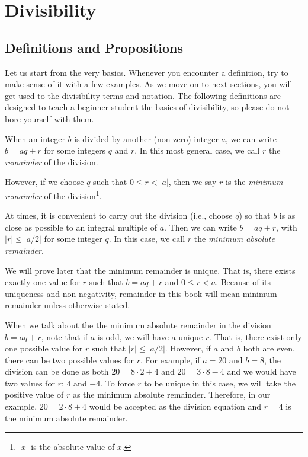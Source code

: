 \chapter{Divisibility}\label{ch:divisibility}

\section{Definitions and Propositions}
Let us start from the very basics. Whenever you encounter a definition, try to make sense of it with a few examples. As we move on to next sections, you will get used to the divisibility terms and notation. The following definitions are designed to teach a beginner student the basics of divisibility, so please do not bore yourself with them.
\begin{definition}\label{def:remainder}
	When an integer $b$ is divided by another (non-zero) integer $a$, we can write $b=aq+r$ for some integers $q$ and $r$. In this most general case, we call $r$ the \textit{remainder} of the division.

	However, if we choose $q$ such that $0\leq r< |a|$, then we say $r$ is the \textit{minimum remainder} of the division\footnote{$|x|$ is the absolute value of $x$.}.

	At times, it is convenient to carry out the division (i.e., choose $q$) so that $b$ is as close as possible to an integral multiple of $a$. Then we can write $b = aq + r$, with $|r| \leq |a/2|$ for some integer $q$.  In this case, we call $r$ the \textit{minimum absolute remainder}.
\end{definition}

\begin{note}[1]
	We will prove later that the minimum remainder is unique. That is, there exists exactly one value for $r$ such that $b=aq+r$ and $0 \leq r <a$. Because of its uniqueness and non-negativity, remainder in this book will mean minimum remainder unless otherwise stated.
\end{note}

\begin{note}[2]
	When we talk about the the minimum absolute remainder in the division $b=aq+r$, note that if $a$ is odd, we will have a unique $r$. That is, there exist only one possible value for $r$ such that $|r| \leq \left|a/2\right|$. However, if $a$ and $b$ both are even, there can be two possible values for $r$. For example, if $a=20$ and $b=8$, the division can be done as both $20=8\cdot2+4$ and $20=3\cdot8-4$ and we would have two values for $r$: $4$ and $-4$. To force $r$ to be unique in this case, we will take the positive value of $r$ as the minimum absolute remainder. Therefore, in our example, $20=2\cdot8+4$ would be accepted as the division equation and $r=4$ is the minimum absolute remainder.
\end{note}

